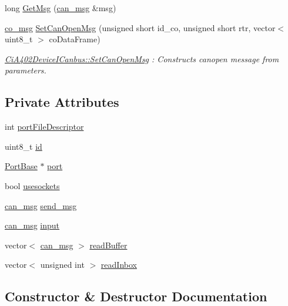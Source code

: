 \begin{DoxyCompactItemize}
\item 
long \hyperlink{classCiA301CommPort_a645450ca09e07ea6da339923ceeec934}{Get\+Msg} (\hyperlink{structcan__msg}{can\+\_\+msg} \&msg)
\item 
\hyperlink{structco__msg}{co\+\_\+msg} \hyperlink{classCiA301CommPort_a2c197480112989df6bdb9ea89a649636}{Set\+Can\+Open\+Msg} (unsigned short id\+\_\+co, unsigned short rtr, vector$<$ uint8\+\_\+t $>$ co\+Data\+Frame)
\begin{DoxyCompactList}\small\item\em \hyperlink{classCiA402DeviceICanbus_aa439b9175f5879282058a3f4c2edb45d}{Ci\+A402\+Device\+I\+Canbus\+::\+Set\+Can\+Open\+Msg} \+: Constructs canopen message from parameters. \end{DoxyCompactList}\end{DoxyCompactItemize}
\subsection*{Private Attributes}
\begin{DoxyCompactItemize}
\item 
int \hyperlink{classCiA301CommPort_adc50c8d333b18fcb1b5c61ca69ea05c6}{port\+File\+Descriptor}
\item 
uint8\+\_\+t \hyperlink{classCiA301CommPort_a1ae075d22fc854da21a6e691bb029fc0}{id}
\item 
\hyperlink{classPortBase}{Port\+Base} $\ast$ \hyperlink{classCiA301CommPort_a6b8366387075c99ee980d2ca79c7b7fc}{port}
\item 
bool \hyperlink{classCiA301CommPort_a579e0de814111bde3bbe18cceb76ce64}{usesockets}
\item 
\hyperlink{structcan__msg}{can\+\_\+msg} \hyperlink{classCiA301CommPort_ade81ac897a5d851d946dd7a18245b75d}{send\+\_\+msg}
\item 
\hyperlink{structcan__msg}{can\+\_\+msg} \hyperlink{classCiA301CommPort_ae0f955c7141e2067307cea0b48e111d4}{input}
\item 
vector$<$ \hyperlink{structcan__msg}{can\+\_\+msg} $>$ \hyperlink{classCiA301CommPort_a8b904f3591ecfb99fd82271343727215}{read\+Buffer}
\item 
vector$<$ unsigned int $>$ \hyperlink{classCiA301CommPort_a41b2fcb24a27e5280417db03d8cdb399}{read\+Inbox}
\end{DoxyCompactItemize}


\subsection{Constructor \& Destructor Documentation}
\mbox{\label{classCiA301CommPort_aae705cb5c6a405ef74a10e5220d0b08f}} 
